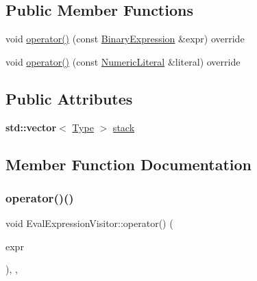 \subsection*{Public Member Functions}
\begin{DoxyCompactItemize}
\item 
void \hyperlink{struct_eval_expression_visitor_a2e82e15208fff6395063cba90be79e48}{operator()} (const \hyperlink{struct_binary_expression}{Binary\+Expression} \&expr) override
\item 
void \hyperlink{struct_eval_expression_visitor_a4eb471ad8286c264eb2af55aaf6c5a45}{operator()} (const \hyperlink{struct_numeric_literal}{Numeric\+Literal} \&literal) override
\end{DoxyCompactItemize}
\subsection*{Public Attributes}
\begin{DoxyCompactItemize}
\item 
\textbf{ std\+::vector}$<$ \hyperlink{class_type}{Type} $>$ \hyperlink{struct_eval_expression_visitor_acff7a9754c87fac4c34bbb6ad3318cae}{stack}
\end{DoxyCompactItemize}


\subsection{Member Function Documentation}
\mbox{\label{struct_eval_expression_visitor_a2e82e15208fff6395063cba90be79e48}} 
\subsubsection{\texorpdfstring{operator()()}{operator()()}\hspace{0.1cm}{\footnotesize\ttfamily [1/2]}}
{\footnotesize\ttfamily void Eval\+Expression\+Visitor\+::operator() (\begin{DoxyParamCaption}\item[{const \hyperlink{struct_binary_expression}{Binary\+Expression} \&}]{expr }\end{DoxyParamCaption})\hspace{0.3cm}{\ttfamily [inline]}, {\ttfamily [override]}, {\ttfamily [virtual]}}




